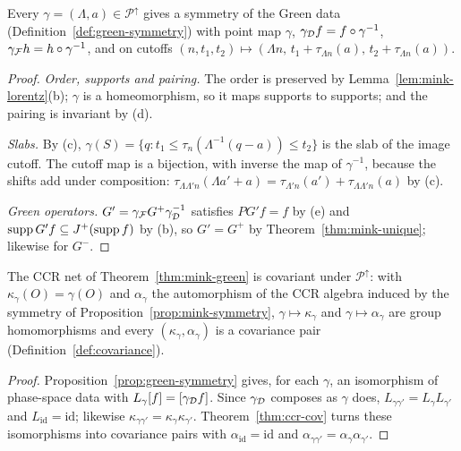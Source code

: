 \begin{proposition}\label{prop:mink-symmetry}
Every $\gamma=(\Lambda,a)\in\mathcal P^\uparrow$ gives a symmetry of the Green data
(Definition~\ref{def:green-symmetry}) with point map $\gamma$, $\gamma_\mathcal D f=f\circ\gamma^{-1}$,
$\gamma_\mathcal F h=h\circ\gamma^{-1}$, and on cutoffs
$(n,t_1,t_2)\mapsto(\Lambda n,\,t_1+\tau_{\Lambda n}(a),\,t_2+\tau_{\Lambda n}(a))$.
\end{proposition}
\begin{proof}
\emph{Order, supports and pairing.} The order is preserved by Lemma~\ref{lem:mink-lorentz}(b);
$\gamma$ is a homeomorphism, so it maps supports to supports; and the pairing is invariant by (d).

\emph{Slabs.} By (c), $\gamma(S)=\{q:t_1\le\tau_n(\Lambda^{-1}(q-a))\le t_2\}$ is the slab of the image
cutoff. The cutoff map is a bijection, with inverse the map of $\gamma^{-1}$, because the shifts add
under composition: $\tau_{\Lambda\Lambda'n}(\Lambda a'+a)=\tau_{\Lambda'n}(a')+\tau_{\Lambda\Lambda'n}(a)$ by
(c).

\emph{Green operators.} $G'=\gamma_\mathcal F G^+\gamma_\mathcal D^{-1}$ satisfies $PG'f=f$ by (e) and
$\operatorname{supp} G'f\subseteq J^+(\operatorname{supp} f)$ by (b), so $G'=G^+$ by Theorem~\ref{thm:mink-unique}; likewise for
$G^-$.
\end{proof}

\begin{theorem}\label{thm:mink-covariance}
The CCR net of Theorem~\ref{thm:mink-green} is covariant under $\mathcal P^\uparrow$: with
$\kappa_\gamma(O)=\gamma(O)$ and $\alpha_\gamma$ the automorphism of the CCR algebra induced by the
symmetry of Proposition~\ref{prop:mink-symmetry}, $\gamma\mapsto\kappa_\gamma$ and
$\gamma\mapsto\alpha_\gamma$ are group homomorphisms and every $(\kappa_\gamma,\alpha_\gamma)$ is a
covariance pair (Definition~\ref{def:covariance}).
\end{theorem}
\begin{proof}
Proposition~\ref{prop:green-symmetry} gives, for each $\gamma$, an isomorphism of phase-space data with
$L_\gamma[f]=[\gamma_\mathcal D f]$. Since $\gamma_\mathcal D$ composes as $\gamma$ does,
$L_{\gamma\gamma'}=L_\gamma L_{\gamma'}$ and $L_{\mathrm{id}}=\mathrm{id}$; likewise
$\kappa_{\gamma\gamma'}=\kappa_\gamma\kappa_{\gamma'}$. Theorem~\ref{thm:ccr-cov} turns these
isomorphisms into covariance pairs with $\alpha_{\mathrm{id}}=\mathrm{id}$ and
$\alpha_{\gamma\gamma'}=\alpha_\gamma\alpha_{\gamma'}$.
\end{proof}
\noindent{}

